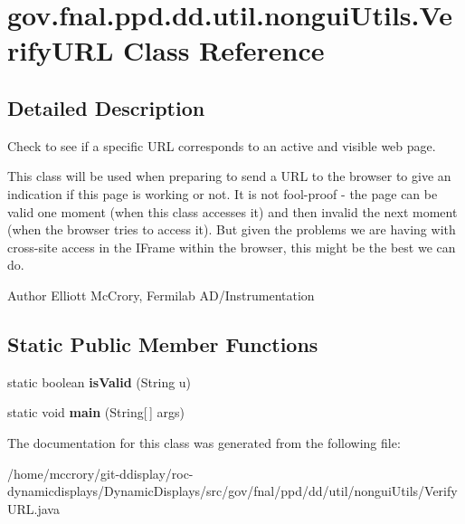 \hypertarget{classgov_1_1fnal_1_1ppd_1_1dd_1_1util_1_1nonguiUtils_1_1VerifyURL}{\section{gov.\-fnal.\-ppd.\-dd.\-util.\-nongui\-Utils.\-Verify\-U\-R\-L Class Reference}
\label{classgov_1_1fnal_1_1ppd_1_1dd_1_1util_1_1nonguiUtils_1_1VerifyURL}
}


\subsection{Detailed Description}
Check to see if a specific U\-R\-L corresponds to an active and visible web page.

This class will be used when preparing to send a U\-R\-L to the browser to give an indication if this page is working or not. It is not fool-\/proof -\/ the page can be valid one moment (when this class accesses it) and then invalid the next moment (when the browser tries to access it). But given the problems we are having with cross-\/site access in the I\-Frame within the browser, this might be the best we can do.

\begin{DoxyAuthor}{Author}
Elliott Mc\-Crory, Fermilab A\-D/\-Instrumentation 
\end{DoxyAuthor}
\subsection*{Static Public Member Functions}
\begin{DoxyCompactItemize}
\item 
\hypertarget{classgov_1_1fnal_1_1ppd_1_1dd_1_1util_1_1nonguiUtils_1_1VerifyURL_a7bb140c03fe2d3b8c5db95d5125366f0}{static boolean {\bfseries is\-Valid} (String u)}\label{classgov_1_1fnal_1_1ppd_1_1dd_1_1util_1_1nonguiUtils_1_1VerifyURL_a7bb140c03fe2d3b8c5db95d5125366f0}

\item 
\hypertarget{classgov_1_1fnal_1_1ppd_1_1dd_1_1util_1_1nonguiUtils_1_1VerifyURL_aeb525d904ceb8db0590f2dcb7f0b8b38}{static void {\bfseries main} (String\mbox{[}$\,$\mbox{]} args)}\label{classgov_1_1fnal_1_1ppd_1_1dd_1_1util_1_1nonguiUtils_1_1VerifyURL_aeb525d904ceb8db0590f2dcb7f0b8b38}

\end{DoxyCompactItemize}


The documentation for this class was generated from the following file\-:\begin{DoxyCompactItemize}
\item 
/home/mccrory/git-\/ddisplay/roc-\/dynamicdisplays/\-Dynamic\-Displays/src/gov/fnal/ppd/dd/util/nongui\-Utils/Verify\-U\-R\-L.\-java\end{DoxyCompactItemize}
